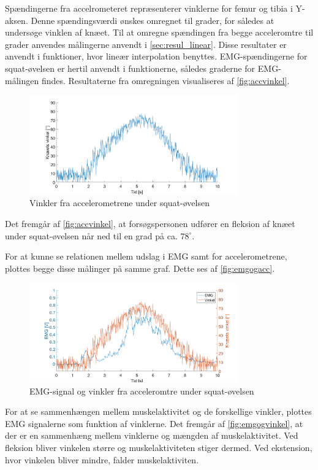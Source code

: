 Spændingerne fra accelrometeret repræsenterer vinklerne for femur og tibia i Y-aksen. Denne spændingsværdi ønskes omregnet til grader, for således at undersøge vinklen af knæet. Til at omregne spændingen fra begge acceleromtre til grader anvendes målingerne anvendt i \autoref{sec:resul_linear}. Disse resultater er anvendt i funktioner, hvor lineær interpolation benyttes. EMG-spændingerne for squat-øvelsen er hertil anvendt i funktionerne, således graderne for EMG-målingen findes.
Resultaterne fra omregningen visualiseres af \autoref{fig:accvinkel}. 

\begin{figure}[H]
	\centering
	\includegraphics[width=0.8\textwidth]{figures/Pilotforsoeg/accvinkel}
	\caption{Vinkler fra accelerometrene under squat-øvelsen}
	\label{fig:accvinkel}
\end{figure}
Det fremgår af \autoref{fig:accvinkel}, at forsøgspersonen udfører en fleksion af knæet under squat-øvelsen når ned til en grad på ca. $78^{\circ}$. 

For at kunne se relationen mellem udslag i EMG samt for accelerometrene, plottes begge disse målinger på samme graf. Dette ses af \autoref{fig:emgogacc}. 
\begin{figure}[H]
	\centering
	\includegraphics[width=0.8\textwidth]{figures/Pilotforsoeg/emg_vinkler_tid}
	\caption{EMG-signal og vinkler fra acceleromtre under squat-øvelsen}
	\label{fig:emgogacc}
\end{figure}


For at se sammenhængen mellem muskelaktivitet og de forskellige vinkler, plottes EMG signalerne som funktion af vinklerne. Det fremgår af \autoref{fig:emgogvinkel}, at der er en sammenhæng mellem vinklerne og mængden af muskelaktivitet. Ved fleksion bliver vinkelen større og muskelaktiviteten stiger dermed. Ved ekstension, hvor vinkelen bliver mindre, falder muskelaktiviten.





